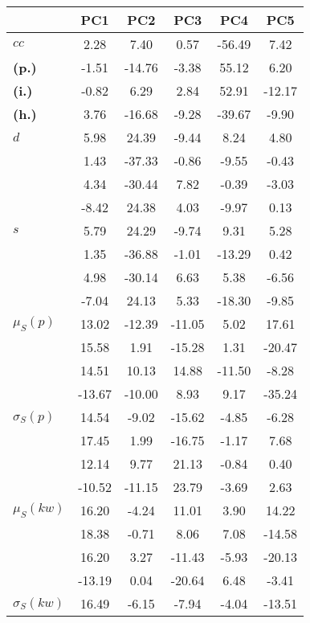 \begin{table}[h!]
\begin{center}
\begin{tabular}{| l || c | c | c | c | c |}\hline
 & {\bf PC1} & {\bf PC2} & {\bf PC3} & {\bf PC4} & {\bf PC5} \\\hline\hline
{\bf $cc$} & 2.28 & 7.40 & 0.57 & -56.49 & 7.42 \\
{\bf (p.)} & -1.51 & -14.76 & -3.38 & 55.12 & 6.20 \\
{\bf (i.)} & -0.82 & 6.29 & 2.84 & 52.91 & -12.17 \\
{\bf (h.)} & 3.76 & -16.68 & -9.28 & -39.67 & -9.90 \\\hline
{\bf $d$} & 5.98 & 24.39 & -9.44 & 8.24 & 4.80 \\
{\bf } & 1.43 & -37.33 & -0.86 & -9.55 & -0.43 \\
{\bf } & 4.34 & -30.44 & 7.82 & -0.39 & -3.03 \\
{\bf } & -8.42 & 24.38 & 4.03 & -9.97 & 0.13 \\\hline
{\bf $s$} & 5.79 & 24.29 & -9.74 & 9.31 & 5.28 \\
{\bf } & 1.35 & -36.88 & -1.01 & -13.29 & 0.42 \\
 & 4.98  & -30.14  & 6.63  & 5.38  & -6.56 \\
 & -7.04  & 24.13  & 5.33  & -18.30  & -9.85 \\\hline
$\mu_S(p)$ & 13.02  & -12.39  & -11.05  & 5.02  & 17.61 \\
 & 15.58  & 1.91  & -15.28  & 1.31  & -20.47 \\
 & 14.51  & 10.13  & 14.88  & -11.50  & -8.28 \\
 & -13.67  & -10.00  & 8.93  & 9.17  & -35.24 \\\hline
$\sigma_S(p)$ & 14.54  & -9.02  & -15.62  & -4.85  & -6.28 \\
 & 17.45  & 1.99  & -16.75  & -1.17  & 7.68 \\
 & 12.14  & 9.77  & 21.13  & -0.84  & 0.40 \\
 & -10.52  & -11.15  & 23.79  & -3.69  & 2.63 \\\hline
$\mu_S(kw)$ & 16.20  & -4.24  & 11.01  & 3.90  & 14.22 \\
 & 18.38  & -0.71  & 8.06  & 7.08  & -14.58 \\
 & 16.20  & 3.27  & -11.43  & -5.93  & -20.13 \\
 & -13.19  & 0.04  & -20.64  & 6.48  & -3.41 \\\hline
$\sigma_S(kw)$ & 16.49  & -6.15  & -7.94  & -4.04  & -13.51 \\

\end{tabular}
\end{center}
\end{table}
